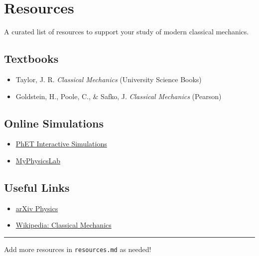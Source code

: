 \section{Resources}\label{resources}

A curated list of resources to support your study of modern classical
mechanics.

\subsection{Textbooks}\label{textbooks}

\begin{itemize}
\tightlist
\item
  Taylor, J. R. \emph{Classical Mechanics} (University Science Books)
\item
  Goldstein, H., Poole, C., \& Safko, J. \emph{Classical Mechanics}
  (Pearson)
\end{itemize}

\subsection{Online Simulations}\label{online-simulations}

\begin{itemize}
\tightlist
\item
  \href{https://phet.colorado.edu/}{PhET Interactive Simulations}
\item
  \href{https://www.myphysicslab.com/}{MyPhysicsLab}
\end{itemize}

\subsection{Useful Links}\label{useful-links}

\begin{itemize}
\tightlist
\item
  \href{https://arxiv.org/archive/physics}{arXiv Physics}
\item
  \href{https://en.wikipedia.org/wiki/Classical_mechanics}{Wikipedia:
  Classical Mechanics}
\end{itemize}

\begin{center}\rule{0.5\linewidth}{0.5pt}\end{center}

Add more resources in \texttt{resources.md} as needed!
